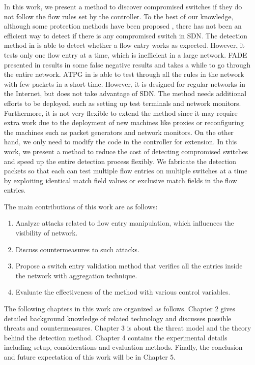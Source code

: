 In this work, we present a method to discover compromised switches if they do not follow the flow rules set by the controller. To the best of our knowledge, although some protection methods have been proposed \cite{CKGL15,PJL16}, there has not been an efficient way to detect if there is any compromised switch in SDN. The detection method in \cite{CKGL15} is able to detect whether a flow entry works as expected. However, it tests only one flow entry at a time, which is inefficient in a large network. FADE presented in \cite{PJL16} results in some false negative results and takes a while to go through the entire network. ATPG in \cite{ZKVM12} is able to test through all the rules in the network with few packets in a short time. However, it is designed for regular networks in the Internet, but does not take advantage of SDN. The method needs additional efforts to be deployed, such as setting up test terminals and network monitors. Furthermore, it is not very flexible to extend the method since it may require extra work due to the deployment of new machines like proxies or reconfiguring the machines such as packet generators and network monitors. On the other hand, we only need to modify the code in the controller for extension. In this work, we present a method to reduce the cost of detecting compromised switches and speed up the entire detection process flexibly. We fabricate the detection packets so that each can test multiple flow entries on multiple switches at a time by exploiting identical match field values or exclusive match fields in the flow entries. 

The main contributions of this work are as follows:
\begin{enumerate}
\item
Analyze attacks related to flow entry manipulation, which influences the visibility of network.
\item
Discuss countermeasures to such attacks.
\item
Propose a switch entry validation method that verifies all the entries inside the network with aggregation technique.
\item
Evaluate the effectiveness of the method with various control variables.
\end{enumerate}

The following chapters in this work are organized as follows. Chapter 2 gives detailed background knowledge of related technology and discusses possible threats and countermeasures. Chapter 3 is about the threat model and the theory behind the detection method. Chapter 4 contains the experimental details including setup, considerations and evaluation methods. Finally, the conclusion and future expectation of this work will be in Chapter 5.